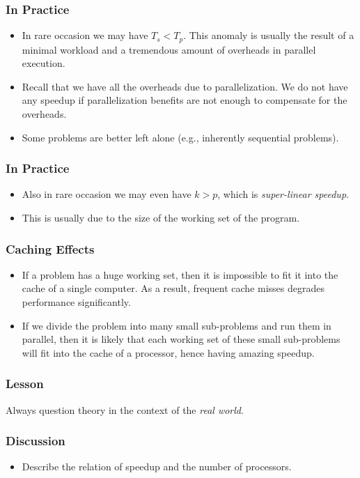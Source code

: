 \documentclass{beamer}
\begin{document}
\begin{CJK}{UTF8}{bsmi}
\begin{frame}
\frametitle{In Practice}
\begin{itemize}
\item In rare occasion we may have $T_s < T_p$.  
This anomaly is usually the result of a minimal workload and a tremendous amount of overheads in parallel execution.
\item Recall that we have all the overheads due to parallelization.  
We do not have any speedup if parallelization benefits are not enough to compensate for the overheads.
\item Some problems are better left alone (e.g., inherently sequential problems).
\end{itemize}
\end{frame}

\begin{frame}
\frametitle{In Practice}
\begin{itemize}
\item Also in rare occasion we may even have $k > p$, which is {\em super-linear speedup}.  
\item This is usually due to the size of the working set of the program.
\end{itemize}
\end{frame}

\begin{frame}
\frametitle{Caching Effects}
\begin{itemize}
\item If a problem has a huge working set, then it is impossible to fit it into the cache of a single computer.  
As a result, frequent cache misses degrades performance significantly.
\item If we divide the problem into many small sub-problems and run them in parallel, then it is likely that each working set of these small sub-problems will fit into the cache of a processor, hence having amazing speedup.
\end{itemize}
\end{frame}

\begin{frame}
\frametitle{Lesson} \huge Always question theory in the context of
the {\em real world}.
\end{frame}

\begin{frame}
\frametitle{Discussion}
\begin{itemize}
\item Describe the relation of speedup and the number of processors.
\end{itemize}
\end{frame}


\end{CJK}
\end{document}
